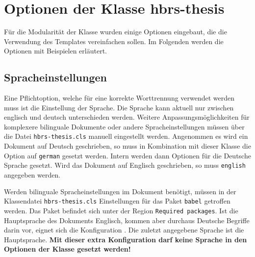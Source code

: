 \chapter{Optionen der Klasse hbrs-thesis}
\label{chap:klassenoptionen}
Für die Modularität der Klasse wurden einige Optionen eingebaut, die die Verwendung des Templates vereinfachen sollen. Im Folgenden werden die Optionen mit Beispielen erläutert.

\section{Spracheinstellungen}
Eine Pflichtoption, welche für eine korrekte Worttrennung verwendet werden muss ist die Einstellung der Sprache. Die Sprache kann aktuell nur zwischen englisch und deutsch unterschieden werden. Weitere Anpassungsmöglichkeiten für komplexere bilinguale Dokumente oder andere Spracheinstellungen müssen über die Datei \texttt{hbrs-thesis.cls} manuell eingestellt werden. Angenommen es wird ein Dokument auf Deutsch geschrieben, so muss in Kombination mit dieser Klasse die Option auf \texttt{german} gesetzt werden. Intern werden dann Optionen für die Deutsche Sprache gesetzt. Wird das Dokument auf Englisch geschrieben, so muss \texttt{english} angegeben werden. 


Werden bilinguale Spracheinstellungen im Dokument benötigt, müssen in der Klassendatei \texttt{hbrs-thesis.cls} Einstellungen für das Paket \texttt{babel} getroffen werden. Das Paket befindet sich unter der Region \texttt{Required packages}. Ist die Hauptsprache des Dokuments Englisch, kommen aber durchaus Deutsche Begriffe darin vor, eignet sich die Konfiguration \texttt{}. Die zuletzt angegebene Sprache ist die Hauptsprache. \textbf{Mit dieser extra Konfiguration darf keine Sprache in den Optionen der Klasse gesetzt werden!}


